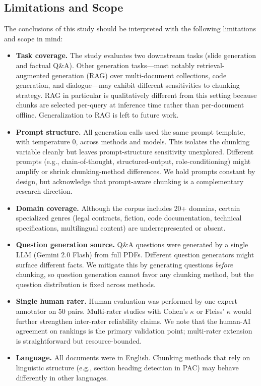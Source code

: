 \documentclass[journal]{IEEEtran}
\begin{document}
\subsection{Limitations and Scope}

The conclusions of this study should be interpreted with the following limitations and scope in mind:

\begin{itemize}
    \item \textbf{Task coverage.} The study evaluates two downstream tasks (slide generation and factual Q\&A). Other generation tasks---most notably retrieval-augmented generation (RAG) over multi-document collections, code generation, and dialogue---may exhibit different sensitivities to chunking strategy. RAG in particular is qualitatively different from this setting because chunks are selected per-query at inference time rather than per-document offline. Generalization to RAG is left to future work.
    \item \textbf{Prompt structure.} All generation calls used the same prompt template, with temperature 0, across methods and models. This isolates the chunking variable cleanly but leaves prompt-structure sensitivity unexplored. Different prompts (e.g., chain-of-thought, structured-output, role-conditioning) might amplify or shrink chunking-method differences. We hold prompts constant by design, but acknowledge that prompt-aware chunking is a complementary research direction.
    \item \textbf{Domain coverage.} Although the corpus includes 20+ domains, certain specialized genres (legal contracts, fiction, code documentation, technical specifications, multilingual content) are underrepresented or absent.
    \item \textbf{Question generation source.} Q\&A questions were generated by a single LLM (Gemini 2.0 Flash) from full PDFs. Different question generators might surface different facts. We mitigate this by generating questions \textit{before} chunking, so question generation cannot favor any chunking method, but the question distribution is fixed across methods.
    \item \textbf{Single human rater.} Human evaluation was performed by one expert annotator on 50 pairs. Multi-rater studies with Cohen's $\kappa$ or Fleiss' $\kappa$ would further strengthen inter-rater reliability claims. We note that the human-AI agreement on rankings is the primary validation point; multi-rater extension is straightforward but resource-bounded.
    \item \textbf{Language.} All documents were in English. Chunking methods that rely on linguistic structure (e.g., section heading detection in PAC) may behave differently in other languages.

\end{itemize}
\end{document}
